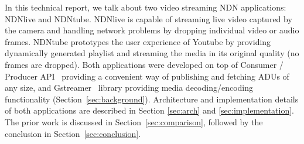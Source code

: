 In this technical report, we talk about two video streaming NDN applications: NDNlive and NDNtube. NDNlive is capable of streaming live video captured by the camera and handling network problems by dropping individual video or audio frames. NDNtube prototypes the user experience of Youtube by providing dynamically generated playlist and streaming the media in its original quality (no frames are dropped). Both applications were developed on top of Consumer / Producer API~\cite{api-tr} providing a convenient way of publishing and fetching ADUs of any size, and Gstreamer~\cite{gstreamer} library providing media decoding/encoding functionality (Section~\ref{sec:background}). Architecture and implementation details of both applications are described in Section \ref{sec:arch} and \ref{sec:implementation}. The prior work is discussed in Section~\ref{sec:comparison}, followed by the conclusion in Section~\ref{sec:conclusion}.
